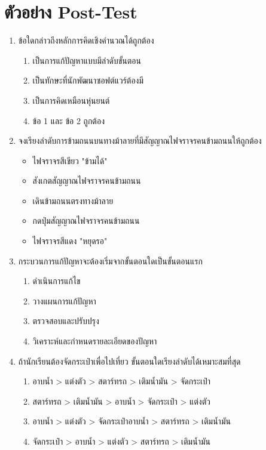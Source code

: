 \section{ตัวอย่าง Post-Test}
\begin{enumerate}
    \item ข้อใดกล่าวถึงหลักการคิดเชิงคำนวณได้ถูกต้อง
    \begin{enumerate}
        \item เป็นการแก้ปัญหาแบบมีลำดับขั้นตอน
        \item เป็นทักษะที่นักพัฒนาซอฟต์แวร์ต้องมี
        \item เป็นการคิดเหมือนหุ่นยนต์
        \item ข้อ 1 และ ข้อ 2 ถูกต้อง
    \end{enumerate}
    \item จงเรียงลำดับการข้ามถนนบนทางม้าลายที่มีสัญญาณไฟจราจรคนข้ามถนนให้ถูกต้อง
    \begin{itemize}
        \item ไฟจราจรสีเขียว "ข้ามได้"
        \item สังเกตสัญญาณไฟจราจรคนข้ามถนน
        \item เดินข้ามถนนตรงทางม้าลาย
        \item กดปุ่มสัญญาณไฟจราจรคนข้ามถนน
        \item ไฟจราจรสีแดง "หยุดรอ"
    \end{itemize}
    \item กระบวนการแก้ปัญหาจะต้องเริ่มจากขั้นตอนใดเป็นขั้นตอนแรก
    \begin{enumerate}
        \item ดำเนินการแก้ไข
        \item วางแผนการแก้ปัญหา
        \item ตรวจสอบและปรับปรุง
        \item วิเคราะห์และกำหนดรายละเอียดของปัญหา
    \end{enumerate}
    \item ถ้านักเรียนต้องจัดกระเป๋าเพื่อไปเที่ยว ขั้นตอนใดเรียงลำดับได้เหมาะสมที่สุด
    \begin{enumerate}
        \item อาบน้ำ > แต่งตัว > สตาร์ทรถ > เติมน้ำมัน > จัดกระเป๋า
        \item สตาร์ทรถ > เติมน้ำมัน > อาบน้ำ > จัดกระเป๋า > แต่งตัว
        \item อาบน้ำ > แต่งตัว > จัดกระเป๋าอาบน้ำ > สตาร์ทรถ > เติมน้ำมัน
        \item จัดกระเป๋า > อาบน้ำ > แต่งตัว > สตาร์ทรถ > เติมน้ำมัน
    \end{enumerate}

\end{enumerate}
